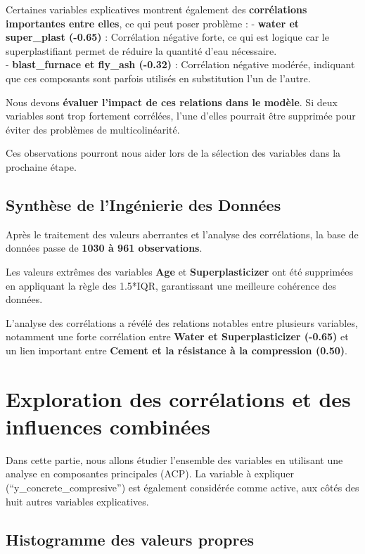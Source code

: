\documentclass[
  12pt,
]{article}
\begin{document}
Certaines variables explicatives montrent également des
\textbf{corrélations importantes entre elles}, ce qui peut poser
problème : - \textbf{water et super\_plast (-0.65)} : Corrélation
négative forte, ce qui est logique car le superplastifiant permet de
réduire la quantité d'eau nécessaire.\\
- \textbf{blast\_furnace et fly\_ash (-0.32)} : Corrélation négative
modérée, indiquant que ces composants sont parfois utilisés en
substitution l'un de l'autre.

Nous devons \textbf{évaluer l'impact de ces relations dans le modèle}.
Si deux variables sont trop fortement corrélées, l'une d'elles pourrait
être supprimée pour éviter des problèmes de multicolinéarité.

Ces observations pourront nous aider lors de la sélection des variables
dans la prochaine étape.

\subsection{Synthèse de l'Ingénierie des
Données}\label{synthuxe8se-de-linguxe9nierie-des-donnuxe9es}

Après le traitement des valeurs aberrantes et l'analyse des
corrélations, la base de données passe de \textbf{1030 à 961
observations}.

Les valeurs extrêmes des variables \textbf{Age} et
\textbf{Superplasticizer} ont été supprimées en appliquant la règle des
1.5*IQR, garantissant une meilleure cohérence des données.

L'analyse des corrélations a révélé des relations notables entre
plusieurs variables, notamment une forte corrélation entre \textbf{Water
et Superplasticizer (-0.65)} et un lien important entre \textbf{Cement
et la résistance à la compression (0.50)}.

\section{Exploration des corrélations et des influences
combinées}\label{exploration-des-corruxe9lations-et-des-influences-combinuxe9es}

Dans cette partie, nous allons étudier l'ensemble des variables en
utilisant une analyse en composantes principales (ACP). La variable à
expliquer (``y\_concrete\_compresive'') est également considérée comme
active, aux côtés des huit autres variables explicatives.

\subsection{Histogramme des valeurs
propres}\label{histogramme-des-valeurs-propres}
\end{document}
